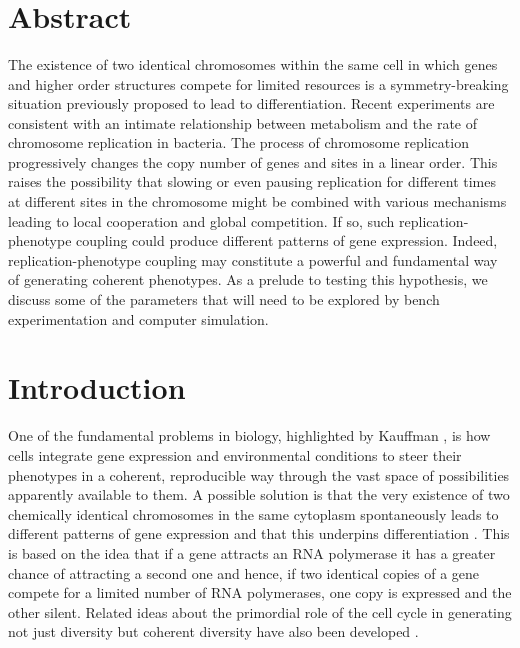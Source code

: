 \documentclass[11pt,a4paper,twoside]{epig}
\begin{document}
\\
\\
\\

\section*{Abstract}
\vspace{-2mm}
The existence of two identical chromosomes within the same cell in which genes and higher order
structures compete for limited resources is a symmetry-breaking situation previously proposed to
lead to differentiation. Recent experiments are consistent with an intimate relationship between
metabolism and the rate of chromosome replication in bacteria. The process of chromosome
replication progressively changes the copy number of genes and sites in a linear order. This raises
the possibility that slowing or even pausing replication for different times at different sites in
the chromosome might be combined with various mechanisms leading to local cooperation and global
competition. If so, such replication-phenotype coupling could produce different patterns of gene
expression. Indeed, replication-phenotype coupling may constitute a powerful and fundamental way of
generating coherent phenotypes. As a prelude to testing this hypothesis, we discuss some of the
parameters that will need to be explored by bench experimentation and computer simulation.

\vspace{-2mm}
\section{Introduction}

One of the fundamental problems in biology, highlighted by Kauffman \cite{14}, is how cells
integrate gene expression and environmental conditions to steer their phenotypes in a coherent,
reproducible way through the vast space of possibilities apparently available to them. A possible
solution is that the very existence of two chemically identical chromosomes in the same cytoplasm
spontaneously leads to different patterns of gene expression and that this underpins
differentiation \cite{25}. This is based on the idea that if a gene attracts an RNA polymerase it
has a greater chance of attracting a second one and hence, if two identical copies of a gene
compete for a limited number of RNA polymerases, one copy is expressed and the other silent.
Related ideas about the primordial role of the cell cycle in generating not just diversity but
coherent diversity have also been developed \cite{30,24}.
\end{document}
